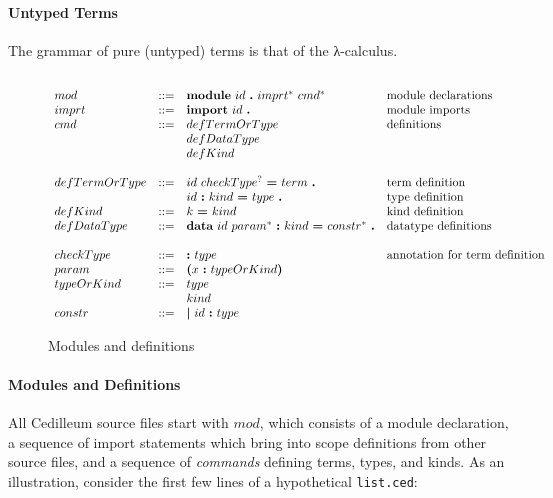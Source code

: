 \documentclass{article}
\begin{document}
\paragraph{Untyped Terms}
The grammar of pure (untyped) terms is that of the λ-calculus.

\begin{figure}[h]
  \[
    \begin{array}{llll}
      \\ mod
      & ::= & \textbf{module}\ id\ \textbf{.}\ imprt^*\ cmd^*\
      & \textnormal{module declarations}
      \\ imprt
      & ::= & \textbf{import}\ id\ \textbf{.}
      & \textnormal{module imports}
      \\ cmd
      & ::= & defTermOrType
      & \textnormal{definitions}
      \\ & & defDataType
      \\ & & defKind
      \\ 
      \\ defTermOrType
      & ::= & id\ checkType^?\ \textbf{=}\ term\ \textbf{.}
      & \textnormal{term definition}
      \\ & & id\ \textbf{:}\ kind\ \textbf{=}\ type\ \textbf{.}
      & \textnormal{type definition}
      \\ defKind
      & ::= & k\ \textbf{=}\ kind
      & \text{kind definition}
      \\ defDataType
      & ::= & \textbf{data}\ id\ param^*\ \textbf{:}\ kind\ \textbf{=}\
              constr^*\ \textbf{.}
      & \textnormal{datatype definitions}
      \\ 
      \\ checkType
      & ::= & \textbf{:}\ type
      & \textnormal{annotation for term definition}
      \\ param
      & ::= & \textbf{(}x\ \textbf{:}\ typeOrKind \textbf{)}
      \\ typeOrKind
      & ::= & type
      \\ & & kind
      \\ constr
      & ::= & \textbf{\textbar}\ id\ \textbf{:}\ type
    \end{array}
  \]
  \caption{Modules and definitions}
  \label{fig:mods-defs}
\end{figure}

\paragraph{Modules and Definitions}
All Cedilleum source files start with $mod$, which consists of a module
declaration, a sequence of import statements which bring into scope definitions
from other source files, and a sequence of \textit{commands} defining terms,
types, and kinds. As an illustration, consider the first few lines of a
hypothetical \texttt{list.ced}:
\end{document}
